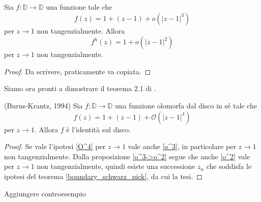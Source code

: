 
\begin{prop} \label{o^3->o^2}
  Sia $f:\mathbb{D} \longrightarrow \mathbb{D}$ una funzione tale che
  \begin{equation} \label{o^3}
    f(z)=1+(z-1)+o(|z-1|^3)
  \end{equation}
  per $z \longrightarrow 1$ non tangenzialmente. Allora
  \begin{equation} \label{o^2}
    f^h(z)=1+o(|z-1|^2)
  \end{equation}
  per $z \longrightarrow 1$ non tangenzialmente.
\end{prop}


\begin{proof}
  Da scrivere, praticamente va copiata.
\end{proof}

Siamo ora pronti a dimostrare il teorema 2.1 di \cite{BK}.

\begin{thm} \label{burns_krantz}
  (Burns-Krantz, 1994) Sia $f:\mathbb{D} \longrightarrow \mathbb{D}$ una funzione olomorfa dal disco in sé tale che
  \begin{equation} \label{O^4}
    f(z)=1+(z-1)+\mathcal{O}(|z-1|^4)
  \end{equation}
  per $z \longrightarrow 1$. Allora $f$ è l'identità sul disco.
\end{thm}


\begin{proof}
  Se vale l'ipotesi \eqref{O^4} per $z \longrightarrow 1$ vale anche \eqref{o^3}, in particolare per $z \longrightarrow 1$ non tangenzialmente. Dalla proposizione \ref{o^3->o^2} segue che anche \eqref{o^2} vale per $z \longrightarrow 1$ non tangenzialmente, quindi esiste una successione $z_n$ che soddisfa le ipotesi del teorema \ref{boundary_schwarz_pick}, da cui la tesi.
\end{proof}

Aggiungere controesempio
